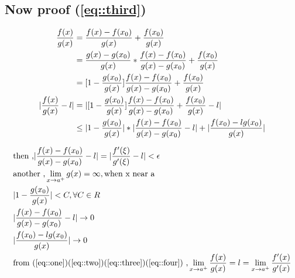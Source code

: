 \documentclass{ctexart}
\begin{document}
\subsection{Now proof (\ref{eq::third})}
\begin{align}
\frac{f(x)}{g(x)}&=\frac{f(x)-f(x_0)}{g(x)}+\frac{f(x_0)}{g(x)}\notag \\
&=\frac{g(x)-g(x_0)}{g(x)}*\frac{f(x)-f(x_0)}{g(x)-g(x_0)}+\frac{f(x_0)}{g(x)}\notag\\
&=[1-\frac{g(x_0)}{g(x)}]\frac{f(x)-f(x_0)}{g(x)-g(x_0)}+\frac{f(x_0)}{g(x)}\\
\arrowvert\frac{f(x)}{g(x)}-l\arrowvert&=\arrowvert[1-\frac{g(x_0)}{g(x)}]\frac{f(x)-f(x_0)}{g(x)-g(x_0)}+\frac{f(x_0)}{g(x)}-l\arrowvert \notag \\
&\le\arrowvert1-\frac{g(x_0)}{g(x)}\arrowvert*\arrowvert\frac{f(x)-f(x_0)}{g(x)-g(x_0)}-l\arrowvert+\arrowvert\frac{f(x_0)-lg(x_0)}{g(x)}\arrowvert\label{eq::one}
\end{align}

\begin{align}
&\text{then ,}\arrowvert\frac{f(x)-f(x_0)}{g(x)-g(x_0)}-l\arrowvert=\arrowvert\frac{f'(\xi)}{g'(\xi)}-l\arrowvert<\epsilon \notag\\
&\text{another ,}\lim_{x \rightarrow a^+}g(x)=\infty ,\text{when x near a}\notag\\
&\arrowvert1-\frac{g(x_0)}{g(x)}\arrowvert<C,\forall C \in R\label{eq::two}\\
&\arrowvert\frac{f(x)-f(x_0)}{g(x)-g(x_0)}-l\arrowvert\rightarrow0\label{eq::three}\\
&\arrowvert\frac{f(x_0)-lg(x_0)}{g(x)}\arrowvert\rightarrow0\label{eq::four}\\
&\text{from (\ref{eq::one})(\ref{eq::two})(\ref{eq::three})(\ref{eq::four}) ,}\lim_{x \rightarrow a^+}\frac{f(x)}{g(x)}=l=\lim_{x \rightarrow a^+}\frac{f'(x)}{g'(x)}
\end{align}
\end{document}
